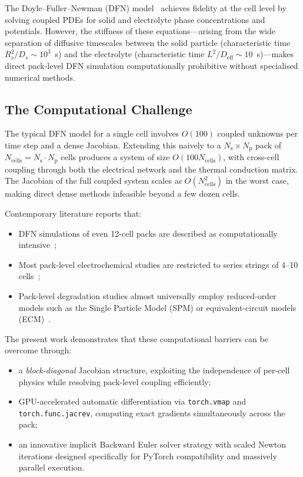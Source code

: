 The Doyle--Fuller--Newman (DFN) model~\cite{Doyle1993,Fuller1994} achieves fidelity at the cell level by solving coupled PDEs for solid and electrolyte phase concentrations and potentials. However, the stiffness of these equations---arising from the wide separation of diffusive timescales between the solid particle (characteristic time $R_s^2/D_s \sim 10^3$~s) and the electrolyte (characteristic time $L^2/D_\text{eff} \sim 10$~s)---makes direct pack-level DFN simulation computationally prohibitive without specialised numerical methods.

\subsection{The Computational Challenge}
\label{ssec:comp_challenge}

The typical DFN model for a single cell involves $O(100)$ coupled unknowns per time step and a dense Jacobian. Extending this naively to a $N_\text{s} \times N_\text{p}$ pack of $N_\text{cells} = N_\text{s} \cdot N_\text{p}$ cells produces a system of size $O(100 N_\text{cells})$, with cross-cell coupling through both the electrical network and the thermal conduction matrix. The Jacobian of the full coupled system scales as $O(N_\text{cells}^2)$ in the worst case, making direct dense methods infeasible beyond a few dozen cells.

Contemporary literature reports that:
\begin{itemize}[noitemsep]
  \item DFN simulations of even 12-cell packs are described as computationally intensive~\cite{Kim2011};
  \item Most pack-level electrochemical studies are restricted to series strings of 4--10 cells~\cite{Legrand2014};
  \item Pack-level degradation studies almost universally employ reduced-order models such as the Single Particle Model (SPM) or equivalent-circuit models (ECM)~\cite{Zhang2020,Plett2004}.
\end{itemize}

The present work demonstrates that these computational barriers can be overcome through:
\begin{itemize}[noitemsep]
  \item a \emph{block-diagonal} Jacobian structure, exploiting the independence of per-cell physics while resolving pack-level coupling efficiently;
  \item GPU-accelerated automatic differentiation via \texttt{torch.vmap} and \texttt{torch.func.jacrev}, computing exact gradients simultaneously across the pack;
  \item an innovative implicit Backward Euler solver strategy with scaled Newton iterations designed specifically for PyTorch compatibility and massively parallel execution.
\end{itemize}

